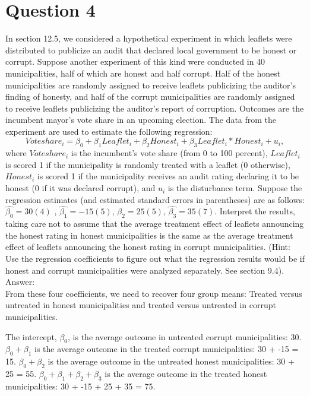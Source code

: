 \documentclass[11pt,notitlepage]{article}\usepackage[]{graphicx}\usepackage[]{color}
\begin{document}
\section*{Question 4}
In section 12.5, we considered a hypothetical experiment in which leaflets were distributed to publicize an audit that declared local government to be honest or corrupt. Suppose another experiment of this kind were conducted in 40 municipalities, half of which are honest and half corrupt. Half of the honest municipalities are randomly assigned to receive leaflets publicizing the auditor's finding of honesty, and half of the corrupt municipalities are randomly assigned to receive leaflets publicizing the auditor's report of corruption. Outcomes are the incumbent mayor's vote share in an upcoming election. The data from the experiment are used to estimate the following regression:
\begin{equation*}
Voteshare_i = \beta_0 + \beta_1 Leaflet_i + \beta_2 Honest_i + \beta_3 Leaflet_i * Honest_i + u_i,
\end{equation*}
where $Voteshare_i$ is the incumbent's vote share (from 0 to 100 percent), $Leaflet_i$ is scored 1 if the municipality is randomly treated with a leaflet (0 otherwise), $Honest_i$ is scored 1 if the municipality receives an audit rating declaring it to be honest (0 if it was declared corrupt), and $u_i$ is the disturbance term. Suppose the regression estimates (and estimated standard errors in parentheses) are as follows: $\hat{\beta_0} = 30 (4)$ , $\hat{\beta_1}= -15 (5)$, $\hat{\beta_2} = 25 (5)$, $\hat{\beta_3} = 35 (7)$. Interpret the results, taking care not to assume that the average treatment effect of leaflets announcing the honest rating in honest municipalities is the same as the average treatment effect of leaflets announcing the honest rating in corrupt municipalities. (Hint: Use the regression coefficients to figure out what the regression results would be if honest and corrupt municipalities were analyzed separately. See section 9.4).\\
Answer:\\
From these four coefficients, we need to recover four group means: Treated versus untreated in honest municipalities and treated versus untreated in corrupt municipalities.

The intercept, $\beta_0$, is the average outcome in untreated corrupt municipalities: 30.
$\beta_0 + \beta_1$ is the average outcome in the treated corrupt municipalities: 30 + -15 = 15.
$\beta_0 + \beta_2$ is the average outcome in the untreated honest municipalities: 30 + 25 = 55.
$\beta_0 + \beta_1 + \beta_2 + \beta_3$ is the average outcome in the treated honest municipalities: 30 + -15 + 25 + 35 = 75.
\end{document}
